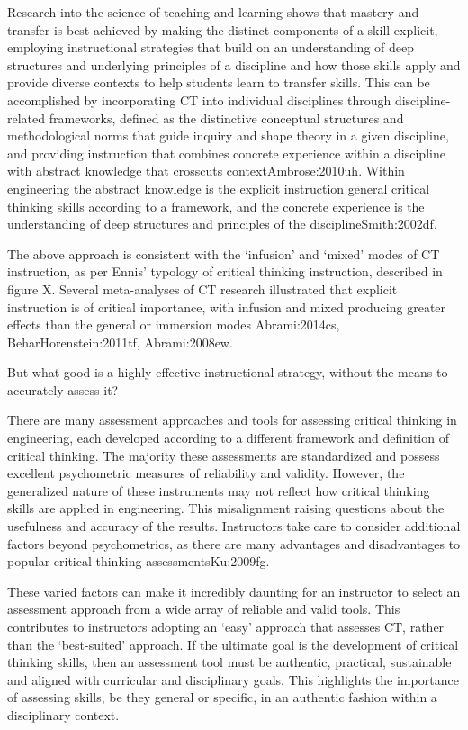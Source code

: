 Research into the science of teaching and learning shows that mastery and transfer is best achieved by making the distinct components of a skill explicit, employing instructional strategies that build on an understanding of deep structures and underlying principles of a discipline and how those skills apply and provide diverse contexts to help students learn to transfer skills. This can be accomplished by incorporating CT into individual disciplines through discipline-related frameworks, defined as the distinctive conceptual structures and methodological norms that guide inquiry and shape theory in a given discipline, and providing instruction that combines concrete experience within a discipline with abstract knowledge that crosscuts context{Ambrose:2010uh}. Within engineering the abstract knowledge is the explicit instruction general critical thinking skills according to a framework, and the concrete experience is the understanding of deep structures and principles of the discipline{Smith:2002df}.  

The above approach is consistent with the ‘infusion’ and ‘mixed’ modes of CT instruction, as per Ennis’ typology of critical thinking instruction, described in figure X.  Several meta-analyses of CT research illustrated that explicit instruction is of critical importance, with infusion and mixed producing greater effects than the general or immersion modes {Abrami:2014cs, BeharHorenstein:2011tf, Abrami:2008ew}.  



But what good is a highly effective instructional strategy, without the means to accurately assess it?

There are many assessment approaches and tools for assessing critical thinking in engineering, each developed according to a different framework and definition of critical thinking.  The majority these assessments are standardized and possess excellent psychometric measures of reliability and validity.  However, the generalized nature of these instruments may not reflect how critical thinking skills are applied in engineering.  This misalignment raising questions about the usefulness and accuracy of the results.  Instructors take care to consider additional factors beyond psychometrics, as there are many advantages and disadvantages to popular critical thinking assessments{Ku:2009fg}.

These varied factors can make it incredibly daunting for an instructor to select an assessment approach from a wide array of reliable and valid tools.  This contributes to instructors adopting an ‘easy’ approach that assesses CT, rather than the ‘best-suited’ approach.  If the ultimate goal is the development of critical thinking skills, then an assessment tool must be authentic, practical, sustainable and aligned with curricular and disciplinary goals.  This highlights the importance of assessing skills, be they general or specific, in an authentic fashion within a disciplinary context.

